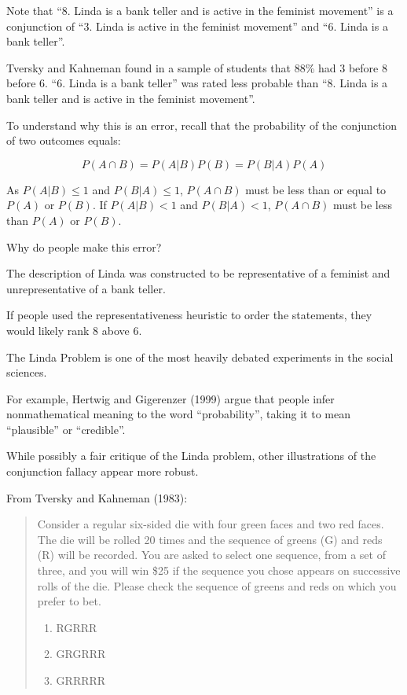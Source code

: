 \documentclass[
  letterpaper,
  DIV=11,
  numbers=noendperiod]{scrreprt}
\begin{document}
Note that ``8. Linda is a bank teller and is active in the feminist
movement'' is a conjunction of ``3. Linda is active in the feminist
movement'' and ``6. Linda is a bank teller''.

Tversky and Kahneman found in a sample of students that 88\% had 3
before 8 before 6. ``6. Linda is a bank teller'' was rated less probable
than ``8. Linda is a bank teller and is active in the feminist
movement''.

To understand why this is an error, recall that the probability of the
conjunction of two outcomes equals:

\[
P(A\cap B)=P(A|B)P(B)=P(B|A)P(A)
\]

As \(P(A|B)\leq 1\) and \(P(B|A)\leq 1\), \(P(A\cap B)\) must be less
than or equal to \(P(A)\) or \(P(B)\). If \(P(A|B)<1\) and \(P(B|A)<1\),
\(P(A\cap B)\) must be less than \(P(A)\) or \(P(B)\).

Why do people make this error?

The description of Linda was constructed to be representative of a
feminist and unrepresentative of a bank teller.

If people used the representativeness heuristic to order the statements,
they would likely rank 8 above 6.

The Linda Problem is one of the most heavily debated experiments in the
social sciences.

For example, Hertwig and Gigerenzer (1999) argue that people infer
nonmathematical meaning to the word ``probability'', taking it to mean
``plausible'' or ``credible''.

While possibly a fair critique of the Linda problem, other illustrations
of the conjunction fallacy appear more robust.

From Tversky and Kahneman (1983):

\begin{quote}
Consider a regular six-sided die with four green faces and two red
faces. The die will be rolled 20 times and the sequence of greens (G)
and reds (R) will be recorded. You are asked to select one sequence,
from a set of three, and you will win \$25 if the sequence you chose
appears on successive rolls of the die. Please check the sequence of
greens and reds on which you prefer to bet.

\begin{enumerate}
\def\labelenumi{\arabic{enumi}.}
\item
  RGRRR
\item
  GRGRRR
\item
  GRRRRR
\end{enumerate}
\end{quote}
\end{document}

